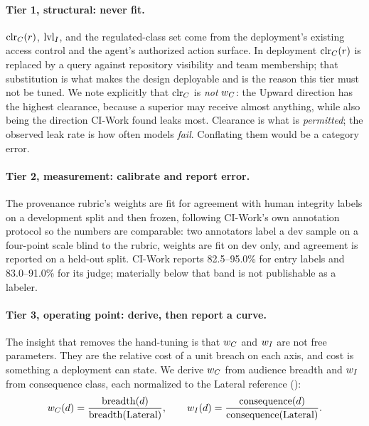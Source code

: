 \paragraph{Tier 1, structural: never fit.} $\mathrm{clr}_C(r)$, $\mathrm{lvl}_I$, and the
regulated-class set come from the deployment's existing access control and the
agent's authorized action surface. In deployment $\mathrm{clr}_C(r)$ is replaced by a
query against repository visibility and team membership; that substitution is
what makes the design deployable and is the reason this tier must not be
tuned. We note explicitly that $\mathrm{clr}_C$ is \emph{not} $w_C$: the Upward
direction has the highest clearance, because a superior may receive almost
anything, while also being the direction CI-Work found leaks most. Clearance is
what is \emph{permitted}; the observed leak rate is how often models
\emph{fail}. Conflating them would be a category error.

\paragraph{Tier 2, measurement: calibrate and report error.} The provenance
rubric's weights are fit for agreement with human integrity labels on a
development split and then frozen, following CI-Work's own annotation protocol
so the numbers are comparable: two annotators label a dev sample on a four-point
scale blind to the rubric, weights are fit on dev only, and agreement is
reported on a held-out split. CI-Work reports 82.5--95.0\% for entry labels and
83.0--91.0\% for its judge; materially below that band is not publishable as a
labeler. 

\paragraph{Tier 3, operating point: derive, then report a curve.} The insight
that removes the hand-tuning is that $w_C$ and $w_I$ are not free parameters.
They are the relative cost of a unit breach on each axis, and cost is something
a deployment can state. We derive $w_C$ from audience breadth and $w_I$ from
consequence class, each normalized to the Lateral reference
():
\begin{equation}
w_C(d) = \frac{\mathrm{breadth}(d)}{\mathrm{breadth}(\text{Lateral})},
\qquad
w_I(d) = \frac{\mathrm{consequence}(d)}{\mathrm{consequence}(\text{Lateral})}.
\end{equation}

